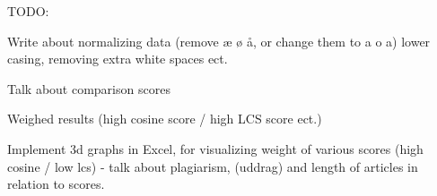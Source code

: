 TODO:

Write about normalizing data (remove æ ø å, or change them to a o a) lower casing, removing extra white spaces ect.

Talk about comparison scores

Weighed results (high cosine score / high LCS score ect.)

Implement 3d graphs in Excel, for visualizing weight of various scores (high cosine / low lcs) - talk about plagiarism, (uddrag) and length of articles in relation to scores.